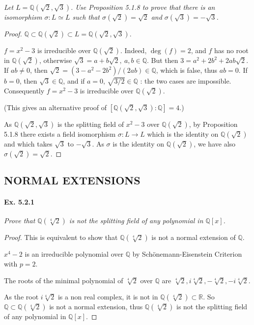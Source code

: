 \documentclass[11pt,a4paper]{article}
\newcommand{\Q}{\mathbb{Q}}
\newcommand{\R}{\mathbb{R}}
\begin{document}
{\it Let $L = \Q(\sqrt{2},\sqrt{3})$. Use Proposition 5.1.8 to prove that there is an isomorphism $\sigma : L \simeq L$ such that $\sigma(\sqrt{2}) = \sqrt{2}$ and $\sigma(\sqrt{3}) = - \sqrt{3}$.
}

\begin{proof}
$\Q \subset \Q(\sqrt{2}) \subset L = \Q(\sqrt{2},\sqrt{3})$.

$f=x^2 - 3$ is irreducible over $\Q(\sqrt{2})$. Indeed, $\deg(f) = 2$, and $f$ has no root in  $\Q(\sqrt{2})$, otherwise $\sqrt{3}  = a + b \sqrt{2}, \ a,b \in \Q$. But then $3 = a^2+2b^2 + 2ab \sqrt{2}$. If $ab \neq 0$, then $\sqrt{2} = (3-a^2-2b^2)/(2ab) \in \Q$, which is false, thus $ab = 0$. If $b=0$, then $\sqrt{3} \in \Q$, and if  $a = 0$, $\sqrt{3/2} \in \Q$ : the two cases are impossible. Consequently $f=x^2 - 3$ is irreducible over $\Q(\sqrt{2})$.

(This gives an alternative proof of $ [\Q(\sqrt{2},\sqrt{3}):\Q] = 4$.)


As $\Q(\sqrt{2},\sqrt{3})$ is the splitting field of $x^2-3$ over $\mathbb{Q}(\sqrt{2})$, by Proposition 5.1.8 there exists a field isomorphism $\sigma : L\to L$ which is the identity on $\Q(\sqrt{2})$ and which takes $\sqrt{3}$ to $-\sqrt{3}$. As $\sigma$ is the identity on $\Q(\sqrt{2})$, we have also $\sigma(\sqrt{2}) = \sqrt{2}$.
\end{proof}

\subsection{NORMAL EXTENSIONS}
\paragraph{Ex. 5.2.1}

{\it Prove that $\Q(\sqrt[4]{2})$ is not the splitting field of any polynomial in $\Q[x]$.
}

\begin{proof}
This is equivalent to show that $\Q(\sqrt[4]{2})$ is not a normal extension of $\Q$.

$x^4 - 2$ is an irreducible polynomial over $\Q$ by Sch\"onemann-Eisenstein Criterion with $p=2$.

The roots of the minimal polynomial of $\sqrt[4]{2}$ over $\Q$ are $\sqrt[4]{2}, i \sqrt[4]{2},-\sqrt[4]{2},-i\sqrt[4]{2}$.

As the root $i \sqrt[4]{2}$ is a non real complex, it is not in $\Q(\sqrt[4]{2})\subset \R$. So $\Q \subset \Q(\sqrt[4]{2})$ is not a normal extension, thus $\Q(\sqrt[4]{2})$ is not the splitting field of any polynomial in $\Q[x]$.
\end{proof}
\end{document}
